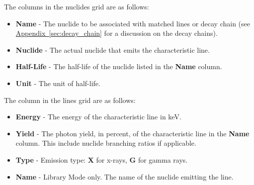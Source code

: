 \documentclass[12pt,report,justified]{SANDreport}
\begin{document}
The columns in the nuclides grid are as follows:
\begin{itemize}
    \item \textbf{Name} - The nuclide to be associated with matched lines or decay chain (see \hyperref[sec:decay_chain]{Appendix~\ref{sec:decay_chain}} for a discussion on the decay chains).
    \item \textbf{Nuclide} - The actual nuclide that emits the characteristic line.
    \item \textbf{Half-Life} - The half-life of the nuclide listed in the \textbf{Name} column.
    \item \textbf{Unit} - The unit of half-life.
\end{itemize}

The column in the lines grid are as follows:
\begin{itemize}
    \item \textbf{Energy} - The energy of the characteristic line in keV.
    \item \textbf{Yield} - The photon yield, in percent, of the characteristic line in the \textbf{Name} column. This include nuclide branching ratios if applicable.
    \item \textbf{Type} - Emission type: \textbf{X} for x-rays, \textbf{G} for gamma rays.
    \item \textbf{Name} - Library Mode only. The name of the nuclide emitting the line.
\end{itemize}
\end{document}
